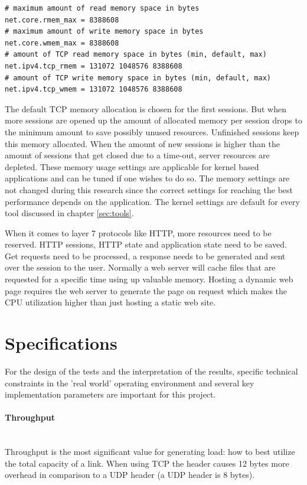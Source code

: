 \newpage

\begin{verbatim}
# maximum amount of read memory space in bytes
net.core.rmem_max = 8388608
# maximum amount of write memory space in bytes
net.core.wmem_max = 8388608
# amount of TCP read memory space in bytes (min, default, max)
net.ipv4.tcp_rmem = 131072 1048576 8388608
# amount of TCP write memory space in bytes (min, default, max)
net.ipv4.tcp_wmem = 131072 1048576 8388608
\end{verbatim}  

The default TCP memory allocation is chosen for the first sessions. But when more sessions are opened up the amount of allocated memory per session drops to the minimum amount to save possibly unused resources. 
Unfinished sessions keep this memory allocated. 
When the amount of new sessions is higher than the amount of sessions that get closed due to a time-out, server resources are depleted.
These memory usage settings are applicable for kernel based applications and can be tuned if one wishes to do so. 
The memory settings are not changed during this research since the correct settings for reaching the best performance depends on the application.
The kernel settings are default for every tool discussed in chapter \ref{sec:tools}.  

When it comes to layer 7 protocols like HTTP, more resources need to be reserved. HTTP sessions, HTTP state and application state need to be saved. Get requests need to be processed, a response needs to be generated and sent over the session to the user. Normally a web server will cache files that are requested for a specific time using up valuable memory. Hosting a dynamic web page requires the web server to generate the page on request which makes the CPU utilization higher than just hosting a static web site. 

\section{Specifications}\label{sec:specifications}
For the design of the tests and the interpretation of the results, specific technical constraints in the 'real world' operating environment and several key implementation parameters are important for this project.

\paragraph{Throughput}\label{par:throughput}\mbox{}\\
Throughput is the most significant value for generating load: how to best utilize the total capacity of a link. When using TCP the header causes 12 bytes more overhead in comparison to a UDP header (a UDP header is 8 bytes).

